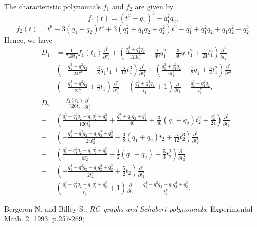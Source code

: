 {{\begin{eqnarray*}
\end{eqnarray*} 
The characteristic polynomials $f_1$ and $f_2$ are given by 
\[ f_1 (t) = ( t^2-q_1)^3 -q_1^2 q_2, \] 
\[ f_2 (t) = t^6 - 3 (q_1 + q_2)t^4 + 3(q_1^2 + q_1 q_2 + q_2^2) 
t^2 -q_1^3 + q_1^2q_2 + q_1 q_2^2 -q_2^3 . \] 
Hence, we have 
\begin{eqnarray*} 
&D_1& =  \frac{1}{720t_1}f_1(t_1)
\frac{\partial^6}{\partial t_1^6} + 
\left( \frac{q_1^3 + q_1^2 q_2}{120t_1^2} 
+\frac{1}{40}q_1^2 -\frac{3}{40}q_1t_1^2 
+\frac{1}{24}t_1^4 \right) 
\frac{\partial^5}{\partial t_1^5}  \\ 
&+& \left( -\frac{q_1^3 + q_1^2 q_2}{24t_1^3} 
- \frac{3}{8}q_1 t_1 + \frac{5}{12}t_1^3 \right) 
\frac{\partial^4}{\partial t_1^4} + 
\left( \frac{q_1^3 + q_1^2 q_2}{6t_1^4} 
-\frac{1}{2}q_1 +\frac{5}{3}t_1^2 \right) 
\frac{\partial^3}{\partial t_1^3}  \\ 
&+& \left( -\frac{q_1^3 + q_1^2 q_2}{2t_1^5} + 
\frac{5}{2}t_1 \right) 
\frac{\partial^2}{\partial t_1^2} + 
\left( \frac{q_1^3 + q_1^2 q_2}{t_1^6} + 1 \right) 
\frac{\partial}{\partial t_1} 
-\frac{q_1^3 + q_1^2 q_2}{t_1^7}, \\ 
&D_2&=\frac{f_2(t_2)}{720t_2} 
\frac{\partial^6}{\partial t_2^6}  \\ 
&+& \left( \frac{q_1^3 - q_1^2 q_2 - q_1 q_2^2 + q_2^3}{120 t_2^2} 
+ \frac{q_1^2 + q_1q_2 + q_2^2}{40} + 
 \frac{3}{40}(q_1 + q_2) t_2^2 + \frac{t_2^4}{24} \right) 
\frac{\partial^5}{\partial t_2 ^5}  \\ 
&+& \left( -\frac{q_1^3 - q_1^2 q_2 - q_1 q_2^2 + q_2^3}
{24 t_2^3} 
- \frac{3}{8}(q_1 + q_2) t_2 + \frac{5}{12}t_2^3 \right) 
\frac{\partial^4}{\partial t_2 ^4}  \\ 
&+& \left( \frac{q_1^3 - q_1^2 q_2 - q_1 q_2^2 + q_2^3}{6 t_2^4} 
-\frac{1}{2}(q_1 + q_2) + \frac{5}{3}t_2^2 \right) 
\frac{\partial^3}{\partial t_2 ^3}  \\ 
&+& \left( -\frac{q_1^3 - q_1^2 q_2 - q_1 q_2^2 + q_2^3}{2t_2^5} 
+ \frac{5}{2}t_2 \right) 
\frac{\partial^2}{\partial t_2 ^2}  \\ 
&+& \left( \frac{q_1^3 - q_1^2 q_2 - q_1 q_2^2 + q_2^3}{t_2^6} 
+ 1 \right) 
\frac{\partial}{\partial t_2}  
 - \frac{q_1^3 - q_1^2 q_2 - q_1 q_2^2 + q_2^3}{t_2^7} . 
\end{eqnarray*} 

\vskip 1cm

\begin{thebibliography}{999}
        \bibitem [BB]{[BB]}
        Bergeron N. and Billey S., {\it RC--graphs and Schubert polynomials,}
        Experimental Math. 2, 1993, p.257-269;


\end{thebibliography}}}
